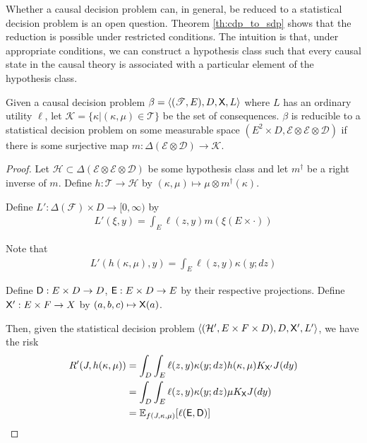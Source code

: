 Whether a causal decision problem can, in general, be reduced to a statistical decision problem is an open question. Theorem \ref{th:cdp_to_sdp} shows that the reduction is possible under restricted conditions. The intuition is that, under appropriate conditions, we can construct a hypothesis class such that every causal state in the causal theory is associated with a particular element of the hypothesis class.

\begin{lemma}\label{lem:red_cdp}
Given a causal decision problem $\beta=\langle (\mathscr{T},E),D,\mathsf{X},L\rangle$ where $L$ has an ordinary utility $\ell$, let $\mathscr{K}=\{\kappa|(\kappa,\mu)\in \mathscr{T}\}$ be the set of consequences. $\beta$ is reducible to a statistical decision problem on some measurable space $(E^2\times D,\mathcal{E}\otimes \mathcal{E}\otimes \mathcal{D})$ if there is some surjective map $m:\Delta(\mathcal{E}\otimes\mathcal{D})\to \mathscr{K}$.
\end{lemma}

\begin{proof}
Let $\mathcal{H}\subset \Delta(\mathcal{E}\otimes \mathcal{E}\otimes \mathcal{D})$ be some hypothesis class and let $m^\dagger$ be a right inverse of $m$. Define $h:\mathscr{T}\to \mathcal{H}$ by $(\kappa,\mu)\mapsto \mu \otimes m^{\dagger}(\kappa)$.

Define $L':\Delta(\mathcal{F})\times D\to [0,\infty)$ by
\begin{align}
    L'(\xi,y) = \int_E \ell(z,y) m(\xi(E\times \cdot))
\end{align}

Note that
\begin{align}
    L'(h(\kappa,\mu),y) = \int_E \ell(z,y) \kappa(y;dz)
\end{align}

Define $\mathsf{D}:E\times D\to D$, $\mathsf{E}:E\times D\to E$ by their respective projections. Define $\mathsf{X}':E\times F\to X$ by $(a,b,c)\mapsto \mathsf{X}(a)$.

Then, given the statistical decision problem $\langle(\mathcal{H}',E\times F\times D),D,\mathsf{X}',L'\rangle$, we have the risk
\begin{align}
    R'(J,h(\kappa,\mu)) &= \int_D \int_E \ell(z,y) \kappa(y;dz)  h(\kappa,\mu) K_{\mathsf{X}'} J(dy) \\
                  &= \int_D \int_E \ell(z,y) \kappa(y;dz) \mu K_{\mathsf{X}} J(dy)\\
                      &= \mathbb{E}_{f(J,\kappa,\mu)}[\ell(\mathsf{E},\mathsf{D})]
\end{align}
\end{proof}

